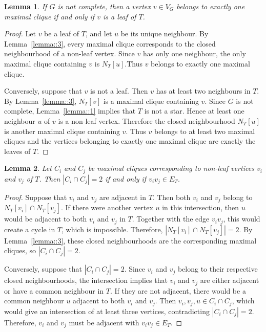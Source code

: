 \documentclass[11pt]{report}
\newtheorem{lemma}{Lemma}
\begin{document}
\begin{lemma}\label{lemma::4}
  If $G$ is not complete, then a vertex $v \in V_G$ belongs to exactly one maximal clique if and only if $v$ is a leaf of $T$.
\end{lemma}
\begin{proof}
  Let $v$ be a leaf of $T$, and let $u$ be its unique neighbour. By Lemma~\ref{lemma::3}, every maximal clique corresponds to the closed neighbourhood of a non-leaf vertex. Since $v$ has only one neighbour, the only maximal clique containing $v$ is $N_T[u]$.Thus $v$ belongs to exactly one maximal clique.

  Conversely, suppose that $v$ is not a leaf. Then $v$ has at least two neighbours in $T$. By Lemma~\ref{lemma::3}, $N_T[v]$ is a maximal clique containing $v$. Since $G$ is not complete, Lemma~\ref{lemma::1} implies that $T$ is not a star. Hence at least one neighbour $u$ of $v$ is a non-leaf vertex. Therefore the closed neighbourhood $N_T[u]$ is another maximal clique containing $v$. Thus $v$ belongs to at least two maximal cliques and the vertices belonging to exactly one maximal clique are exactly the leaves of $T$.
\end{proof}

\begin{lemma}\label{lemma::5}
  Let $C_i$ and $C_j$ be maximal cliques corresponding to non-leaf vertices $v_i$ and $v_j$ of $T$. Then $|C_i \cap C_j|=2$ if and only if $v_iv_j \in E_T$.
\end{lemma}
\begin{proof}
  Suppose that $v_i$ and $v_j$ are adjacent in $T$. Then both $v_i$ and $v_j$ belong to $
  N_T[v_i] \cap N_T[v_j]$. If there were another vertex $u$ in this intersection, then $u$ would be adjacent to both $v_i$ and $v_j$ in $T$. Together with the edge $v_i v_j$, this would create a cycle in $T$, which is impossible. Therefore, $|N_T[v_i] \cap N_T[v_j]|=2$. By Lemma~\ref{lemma::3}, these closed neighbourhoods are the corresponding maximal cliques, so $|C_i \cap C_j| = 2$.

  Conversely, suppose that $|C_i \cap C_j| = 2$. Since $v_i$ and $v_j$ belong to their respective closed neighbourhoods, the intersection implies that $v_i$ and $v_j$ are either adjacent or have a common neighbour in $T$. If they are not adjacent, there would be a common neighbour $u$ adjacent to both $v_i$ and $v_j$. Then $v_i,v_j,u \in C_i \cap C_j$, which would give an intersection of at least three vertices, contradicting $|C_i \cap C_j| = 2$. Therefore, $v_i$ and $v_j$ must be adjacent with $v_iv_j \in E_T$. 
\end{proof}
\end{document}
